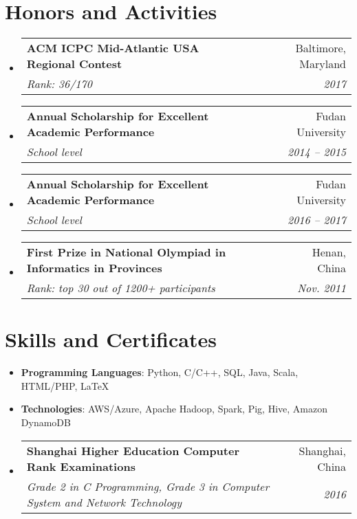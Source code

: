 \documentclass[letterpaper,11pt]{article}
\makeatletter
\newcommand{\resumeSubheading}[4]{
  \vspace{-5pt}\item
    \begin{tabular*}{0.97\textwidth}[t]{l@{\extracolsep{\fill}}r}
      \textbf{#1} & #2 \\
      \textit{\small#3} & \textit{\small #4} \\
    \end{tabular*}\vspace{-4pt}
}
\newcommand{\resumeSubHeadingListStart}{\begin{itemize}[leftmargin=*]}
\newcommand{\resumeSubHeadingListEnd}{\end{itemize}}
\makeatother
\begin{document}
\section{Honors and Activities}
  \resumeSubHeadingListStart
    \resumeSubheading
      {ACM ICPC Mid-Atlantic USA Regional Contest}{Baltimore, Maryland}
      {\emph{Rank: 36/170}}{2017}
    \resumeSubheading
      {Annual Scholarship for Excellent Academic Performance}{Fudan University}
      {School level}{2014 -- 2015}
    \resumeSubheading
      {Annual Scholarship for Excellent Academic Performance}{Fudan University}
      {School level}{2016 -- 2017}
    \resumeSubheading
      {First Prize in National Olympiad in Informatics in Provinces}{Henan, China}
      {\emph{Rank: top 30 out of 1200+ participants}}{Nov. 2011}
  \resumeSubHeadingListEnd

\section{Skills and Certificates}
  \resumeSubHeadingListStart
    \item{
      \textbf{Programming Languages}{: Python, C/C++, SQL, Java, Scala, HTML/PHP, \LaTeX}
    }
    \item{
      \textbf{Technologies}{: AWS/Azure, Apache Hadoop, Spark, Pig, Hive, Amazon DynamoDB}
    }
    \resumeSubheading{Shanghai Higher Education Computer Rank Examinations}{Shanghai, China}
        {\emph{Grade 2 in C Programming, Grade 3 in Computer System and Network Technology}}{2016}
  \resumeSubHeadingListEnd


\end{document}
